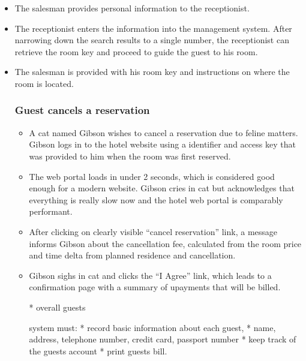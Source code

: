 \begin{itemize}
\begin{end}
\begin{itemize}
  \item The salesman provides personal information to the receptionist.
      
  \item The receptionist enters the information into the management system.
    After narrowing down the search results to a single number, the
    receptionist can retrieve the room key and proceed to guide the guest
    to his room.

  \item The salesman is provided with his room key and instructions on where
      the room is located.
\begin{end}


\subsubsection{Guest cancels a reservation}\label{scenario3}
% 
% 
% 
\begin{itemize}\label{scenario1}
  \item A cat named Gibson wishes to cancel a reservation due to feline matters.
    Gibson logs in to the hotel website using a identifier and access key that
        was provided to him when the room was first reserved.

  \item The web portal loads in under 2 seconds, which is considered good
      enough for a modern website. Gibson cries in cat but acknowledges that
        everything is really slow now and the hotel web portal is comparably
        performant.

  \item After clicking on clearly visible ``cancel reservation'' link, a
      message informs Gibson about the cancellation fee, calculated from the
        room price and time delta from planned residence and cancellation.
      
  \item Gibson sighs in cat and clicks the ``I Agree'' link, which leads to a
      confirmation page with a summary of upayments that will be billed.
\begin{end}



* overall guests

  system must:
    * record basic information about each guest, 
        * name, address, telephone number, credit card, passport number
    * keep track of the guests account
    * print guests bill.




\end{end}
\end{itemize}
\end{end}
\end{itemize}
\end{end}
\end{itemize}
